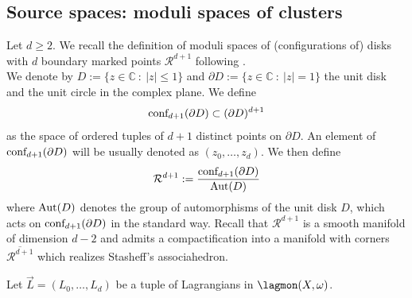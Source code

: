\subsection{Source spaces: moduli spaces of clusters}\label{sourcespaces}
Let $d\geq 2$. We recall the definition of moduli spaces of (configurations of) disks with $d$ boundary marked points $\mathcal{R}^{d+1}$ following \cite[Chapter 9]{Se:book-fukaya-categ}.\\ We denote by $D:=\{z\in \mathbb C \ : \ |z|\leq 1\}$ and $\partial D:=\{z\in \mathbb C \ : \ |z|=1\}$ the unit disk and the unit circle in the complex plane. We define $$\textnormal{conf}_{d+1}(\partial D)\subset (\partial D)^{d+1}$$ as the space of ordered tuples of $d+1$ distinct points on $\partial D$. An element of $\textnormal{conf}_{d+1}(\partial D)$ will be usually denoted as $(z_0,\ldots,z_d)$. We then define $$\mathcal{R}^{d+1}:=\frac{\textnormal{conf}_{d+1}(\partial D)}{\textnormal{Aut}(D)}$$ where $\textnormal{Aut}(D)$ denotes the group of automorphisms of the unit disk $D$, which acts on $\textnormal{conf}_{d+1}(\partial D)$ in the standard way. Recall that $\mathcal{R}^{d+1}$ is a smooth manifold of dimension $d-2$ and admits a compactification into a manifold with corners $\overline{\mathcal{R}^{d+1}}$ which realizes Stasheff's associahedron.

Let $\vec{L}=(L_0,\ldots,L_d)$ be a tuple of Lagrangians in $\lagmon(X,\omega)$.

